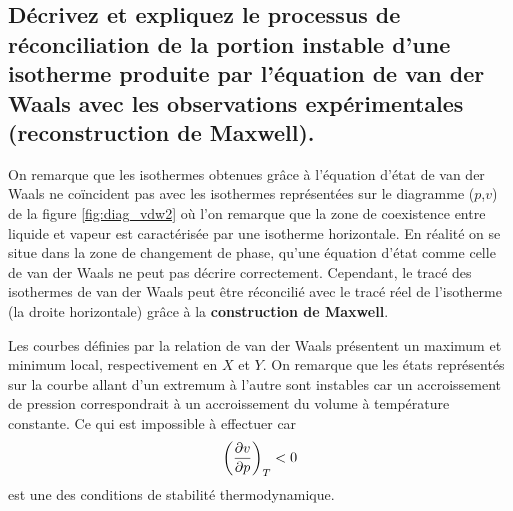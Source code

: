 \subsection{Décrivez et expliquez le processus de réconciliation de la portion instable d'une isotherme produite par l'équation de van der Waals avec les observations expérimentales (reconstruction de Maxwell).}
On remarque que les isothermes obtenues grâce à l'équation d'état de van der Waals ne coïncident pas avec les isothermes représentées sur le diagramme ($p$,$v$) de la figure \ref{fig:diag_vdw2} où l'on remarque que la zone de coexistence entre liquide et vapeur est caractérisée par une isotherme horizontale. En réalité on se situe dans la zone de changement de phase, qu'une équation d'état comme celle de van der Waals ne peut pas décrire correctement. Cependant, le tracé des isothermes de van der Waals peut être réconcilié avec le tracé réel de l'isotherme (la droite horizontale) grâce à la \textbf{construction de Maxwell}.

Les courbes définies par la relation de van der Waals présentent un maximum et minimum local, respectivement en $X$ et $Y$. On remarque que les états représentés sur la courbe allant d'un extremum à l'autre sont instables car un accroissement de pression correspondrait à un accroissement du volume à température constante. Ce qui est impossible à effectuer car
\begin{equation} \left(\frac{\partial v}{\partial p}\right)_T < 0 \end{equation}
est une des conditions de stabilité thermodynamique.

